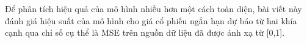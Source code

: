 Để phân tích hiệu quả của mô hình nhiều hơn
một cách toàn diện, bài viết này đánh giá
hiệu suất của mô hình cho giá cổ phiếu ngắn hạn
dự báo từ hai khía cạnh qua chỉ số cụ thể là MSE trên nguồn dữ liệu đã được ánh xạ từ [0,1].
